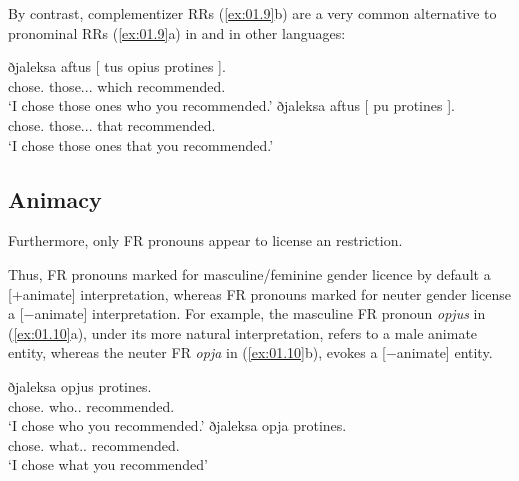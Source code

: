 \documentclass[output=paper]{langsci/langscibook}
\begin{document}
\ea {}\label{ex:01.8}
	\z
\z

By contrast, complementizer \glspl{RR} (\ref{ex:01.9}b)  are a very common alternative to
pronominal \glspl{RR} (\ref{ex:01.9}a) in  and in other languages:

\ea {}\label{ex:01.9}
	\ea
		\gll ðjaleksa aftus [ {tus opius} protines ].\\
        chose.\Fsg{} those.\M.\Pl.\Acc{} {} which recommended.\Ssg{}\\
		\glt \enquote*{I chose those ones who you recommended.}
	\ex
		\gll ðjaleksa aftus [ pu protines ].\\
        chose.\Fsg{} those.\M.\Pl.\Acc{} {} that recommended.\Ssg{}\\
		\glt \enquote*{I chose those ones that you recommended.}
	\z
\z

\subsection{Animacy}
Furthermore, only \gls{FR} pronouns appear to
license an  restriction.

Thus, \gls{FR} pronouns marked for masculine/feminine gender licence by default
a [+animate] interpretation, whereas \gls{FR} pronouns  marked for neuter
gender license a [−animate] interpretation. For example, the masculine \gls{FR}
pronoun \emph{opjus} in (\ref{ex:01.10}a), under its more natural interpretation, refers to
a male animate entity, whereas the neuter \gls{FR} \emph{opja} in (\ref{ex:01.10}b), evokes
a [−animate] entity.\largerpage[2]

\ea {}\label{ex:01.10}
	\ea
		\gll ðjaleksa opjus protines.\\
			chose.\Fsg{} who.\M{}.\Pl{} recommended.\Ssg{}\\
		\glt \enquote*{I chose who you recommended.}
	\ex
		\gll ðjaleksa opja protines.\\
			chose.\Fsg{} what.\glossN.\Pl{} recommended.\Ssg{}\\
		\glt \enquote*{I chose what you recommended}
	\z
\z
\end{document}
